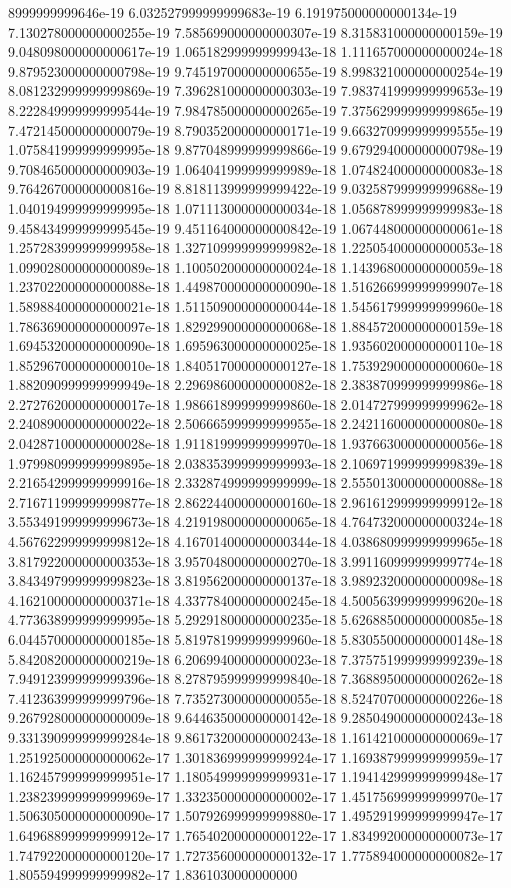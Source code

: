 8999999999646e-19	6.032527999999999683e-19	6.191975000000000134e-19	7.130278000000000255e-19	7.585699000000000307e-19	8.315831000000000159e-19	9.048098000000000617e-19	1.065182999999999943e-18	1.111657000000000024e-18	9.879523000000000798e-19	9.745197000000000655e-19	8.998321000000000254e-19	8.081232999999999869e-19	7.396281000000000303e-19	7.983741999999999653e-19	8.222849999999999544e-19	7.984785000000000265e-19	7.375629999999999865e-19	7.472145000000000079e-19	8.790352000000000171e-19	9.663270999999999555e-19	1.075841999999999995e-18	9.877048999999999866e-19	9.679294000000000798e-19	9.708465000000000903e-19	1.064041999999999989e-18	1.074824000000000083e-18	9.764267000000000816e-19	8.818113999999999422e-19	9.032587999999999688e-19	1.040194999999999995e-18	1.071113000000000034e-18	1.056878999999999983e-18	9.458434999999999545e-19	9.451164000000000842e-19	1.067448000000000061e-18	1.257283999999999958e-18	1.327109999999999982e-18	1.225054000000000053e-18	1.099028000000000089e-18	1.100502000000000024e-18	1.143968000000000059e-18	1.237022000000000088e-18	1.449870000000000090e-18	1.516266999999999907e-18	1.589884000000000021e-18	1.511509000000000044e-18	1.545617999999999960e-18	1.786369000000000097e-18	1.829299000000000068e-18	1.884572000000000159e-18	1.694532000000000090e-18	1.695963000000000025e-18	1.935602000000000110e-18	1.852967000000000010e-18	1.840517000000000127e-18	1.753929000000000060e-18	1.882090999999999949e-18	2.296986000000000082e-18	2.383870999999999986e-18	2.272762000000000017e-18	1.986618999999999860e-18	2.014727999999999962e-18	2.240890000000000022e-18	2.506665999999999955e-18	2.242116000000000080e-18	2.042871000000000028e-18	1.911819999999999970e-18	1.937663000000000056e-18	1.979980999999999895e-18	2.038353999999999993e-18	2.106971999999999839e-18	2.216542999999999916e-18	2.332874999999999999e-18	2.555013000000000088e-18	2.716711999999999877e-18	2.862244000000000160e-18	2.961612999999999912e-18	3.553491999999999673e-18	4.219198000000000065e-18	4.764732000000000324e-18	4.567622999999999812e-18	4.167014000000000344e-18	4.038680999999999965e-18	3.817922000000000353e-18	3.957048000000000270e-18	3.991160999999999774e-18	3.843497999999999823e-18	3.819562000000000137e-18	3.989232000000000098e-18	4.162100000000000371e-18	4.337784000000000245e-18	4.500563999999999620e-18	4.773638999999999995e-18	5.292918000000000235e-18	5.626885000000000085e-18	6.044570000000000185e-18	5.819781999999999960e-18	5.830550000000000148e-18	5.842082000000000219e-18	6.206994000000000023e-18	7.375751999999999239e-18	7.949123999999999396e-18	8.278795999999999840e-18	7.368895000000000262e-18	7.412363999999999796e-18	7.735273000000000055e-18	8.524707000000000226e-18	9.267928000000000009e-18	9.644635000000000142e-18	9.285049000000000243e-18	9.331390999999999284e-18	9.861732000000000243e-18	1.161421000000000069e-17	1.251925000000000062e-17	1.301836999999999924e-17	1.169387999999999959e-17	1.162457999999999951e-17	1.180549999999999931e-17	1.194142999999999948e-17	1.238239999999999969e-17	1.332350000000000002e-17	1.451756999999999970e-17	1.506305000000000090e-17	1.507926999999999880e-17	1.495291999999999947e-17	1.649688999999999912e-17	1.765402000000000122e-17	1.834992000000000073e-17	1.747922000000000120e-17	1.727356000000000132e-17	1.775894000000000082e-17	1.805594999999999982e-17	1.8361030000000000